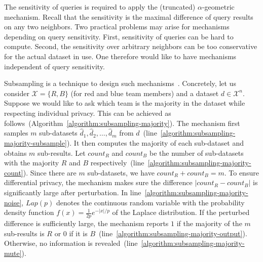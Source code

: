 
The sensitivity of queries is required to apply the (truncated)
$\alpha$-geometric mechanism. Recall that the sensitivity 
is the maximal difference of query results on any two neighbors. 
Two practical problems may arise for
mechanisms depending on query sensitivity. First, 
sensitivity of queries can be hard to compute. Second,
the sensitivity over arbitrary neighbors can be too conservative for
the actual dataset in use. One therefore would like to have
mechanisms independent of query sensitivity.

Subsampling is a technique to design such mechanisms~\cite{DR:14:AFDP}. Concretely, let
us consider $\mathcal{X} = \{ R, B \}$ (for red and blue team members) and a
dataset $d \in \mathcal{X}^n$. Suppose we would like to ask which team
is the majority in the dataset while respecting individual
privacy. This can be achieved as
follows~(Algorithm~\ref{algorithm:subsampling-majority}). The
mechanism first samples $m$ 
sub-datasets $\hat{d}_1, \hat{d}_2, \ldots, \hat{d}_m$ from
$d$~(line~\ref{algorithm:subsampling-majority-subsample}). 
It then computes the majority of each sub-dataset and obtains $m$
sub-results. Let $\mathit{count}_R$ and $\mathit{count}_B$ be the
number of sub-datasets with the majority $R$ and $B$
respectively~(line~\ref{algorithm:subsampling-majority-count}). 
Since there are $m$ sub-datasets, we have
$\mathit{count}_R + \mathit{count}_B = m$. To ensure differential
privacy, the mechanism makes sure the difference $| \mathit{count}_R -
\mathit{count}_B |$ is significantly large after perturbation. In
line~\ref{algorithm:subsampling-majority-noise},
$\mathit{Lap}(p)$ denotes the continuous random
variable with the probability density
function $f(x) = \frac{1}{2p}e^{-|x|/p}$ of the Laplace distribution.
If the perturbed difference is sufficiently large,
the mechanism reports $1$ if the majority of the $m$
sub-results is
$R$ or $0$ if it is
$B$~(line~\ref{algorithm:subsampling-majority-output}). Otherwise,  no
information is 
revealed~(line~\ref{algorithm:subsampling-majority-mute}).

